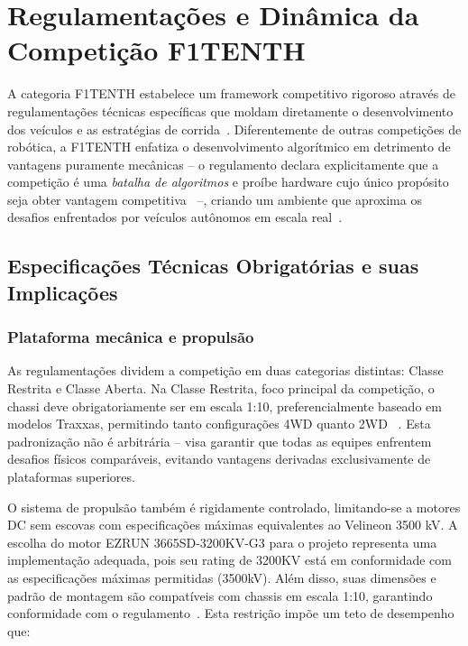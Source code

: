 \chapter{Regulamentações e Dinâmica da Competição F1TENTH}

A categoria F1TENTH estabelece um framework competitivo rigoroso através de
regulamentações técnicas específicas que moldam diretamente o desenvolvimento
dos veículos e as estratégias de corrida~\cite{F1TENTHRules2023}.
Diferentemente de outras competições de robótica, a F1TENTH enfatiza o
desenvolvimento algorítmico em detrimento de vantagens puramente mecânicas --
o regulamento declara explicitamente que a competição é uma \emph{batalha de
algoritmos} e proíbe hardware cujo único propósito seja obter vantagem
competitiva~\cite{F1TENTHRules2023} --, criando um ambiente que aproxima os
desafios enfrentados por veículos autônomos em escala real~\cite{OKelly2020F1TENTH}.

\section{Especificações Técnicas Obrigatórias e suas Implicações}

\subsection{Plataforma mecânica e propulsão}

As regulamentações dividem a competição em duas categorias distintas: Classe
Restrita e Classe Aberta. Na Classe Restrita, foco principal da competição, o
chassi deve obrigatoriamente ser em escala 1:10, preferencialmente baseado em
modelos Traxxas, permitindo tanto configurações 4WD quanto 2WD
~\cite{F1TENTHRules2023}. Esta padronização não é arbitrária -- visa garantir
que todas as equipes enfrentem desafios físicos comparáveis, evitando vantagens
derivadas exclusivamente de plataformas superiores.

O sistema de propulsão também é rigidamente controlado, limitando-se a motores
DC sem escovas com especificações máximas equivalentes ao Velineon 3500 kV. A
escolha do motor EZRUN 3665SD-3200KV-G3 para o projeto representa uma
implementação adequada, pois seu rating de 3200KV está em conformidade com as
especificações máximas permitidas (3500kV). Além disso, suas dimensões e padrão
de montagem são compatíveis com chassis em escala 1:10, garantindo conformidade
com o regulamento~\cite{F1TENTHRules2023}. Esta restrição impõe um teto de
desempenho que:

